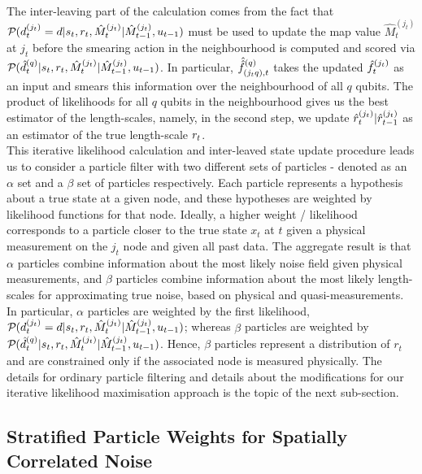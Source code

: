 \\
The inter-leaving part of the calculation comes from the fact that $ \mathcal{P}_{} ( d^{( j_t )}_{t}=d | s_{ t}, r_{ t}, \hat{M}_t^{(j_t)}| \hat{M}_{t-1}^{(j_t)}, u_{t-1} )$ must be used to update the map value $\hat{M}_t^{(j_t)}$ at $j_t$  before the smearing action in the neighbourhood is computed and scored via $\mathcal{P}_{} (  \hat{d}^{( q )}_{t}|s_{ t}, r_{ t}, \hat{M}_t^{(j_t)}| \hat{M}_{t-1}^{(j_t)}, u_{t-1 } )$. In particular, $ \hat{\hat{f}}^{(q)}_{(j_tq),t}$ takes the updated $\hat{f}^{( j_t )}_{t}$ as an input and smears this information over the neighbourhood of all $q$ qubits. The product of likelihoods for all $q$ qubits in the neighbourhood gives us the best estimator of the length-scales, namely, in the second step, we update $\hat{r}^{( j_t )}_{t} | \hat{r}^{( j_t )}_{t-1} $ as an estimator of the true length-scale $r_{ t}$. \\

This iterative likelihood calculation and inter-leaved state update procedure leads us to consider a particle filter with two different sets of particles - denoted as an $\alpha$ set and a $\beta$ set of particles respectively. Each particle represents a hypothesis about a true state at a given node, and these hypotheses are weighted by likelihood functions for that node. Ideally, a higher weight / likelihood corresponds to a particle closer to the true state $x_t$ at $t$ given a physical measurement on the $j_t$ node and given all past data.  The aggregate result is that $\alpha$ particles combine information about the most likely noise field given physical measurements, and $\beta$ particles combine information about the most likely length-scales for approximating true noise, based on physical and quasi-measurements. In particular, $\alpha$ particles are weighted by the first likelihood, $\mathcal{P}_{} ( d^{( j_t )}_{t}=d | s_{ t}, r_{ t}, \hat{M}_t^{(j_t)}| \hat{M}_{t-1}^{(j_t)}, u_{t-1} )$; whereas $\beta$ particles are weighted by $\mathcal{P}_{} (  \hat{d}^{( q )}_{t}|s_{ t}, r_{ t}, \hat{M}_t^{(j_t)}| \hat{M}_{t-1}^{(j_t)}, u_{t-1 } )$. Hence, $\beta$ particles represent a distribution of $r_t$ and are constrained only if the associated node is measured physically. The details for ordinary particle filtering and details about the modifications for our iterative likelihood maximisation approach is the topic of the next sub-section.

\subsection{Stratified Particle Weights for Spatially Correlated Noise}

